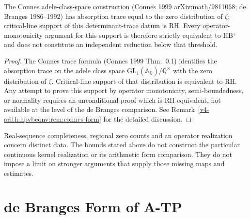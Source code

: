 \begin{proposition}
\label{v4-arith:w7-c:prop:rule-out-operator}
The Connes adele-class-space construction
(Connes 1999 arXiv:math/9811068; de Branges 1986--1992) has absorption
trace equal to the zero distribution of \(\zeta\); critical-line support
of this determinant-trace datum is RH. Every operator-monotonicity
argument for this support is therefore strictly equivalent to HB\(^{+}\)
and does not constitute an independent reduction below that threshold.
\end{proposition}

\begin{proof}
The Connes trace formula (Connes 1999 Thm.~0.1) identifies the
absorption trace on the adele class space
\(\mathrm{GL}_{1}(\mathbb{A}_{\mathbb{Q}})/\mathbb{Q}^{\times}\)
with the zero distribution of \(\zeta\). Critical-line support of that
distribution is equivalent to RH. Any attempt to prove this support by
operator monotonicity, semi-boundedness, or normality requires an
unconditional proof which is
RH-equivalent, not available at the level of the de Branges comparison. See
Remark~\ref{v4-arith:hpvbconv:rem:connes-form} for the detailed
discussion.
\end{proof}

\begin{remark}
\label{v4-arith:w7-c:rem:three-rule-outs}
Real-sequence completeness, regional zero counts and an operator
realization concern distinct data. The bounds stated above do not
construct the particular continuous kernel realization or its
arithmetic form comparison. They do not impose a limit on stronger
arguments that supply those missing maps and estimates.
\end{remark}

\section{de Branges Form of A-TP}
\label{v4-arith:w7-c:wave7-form}

